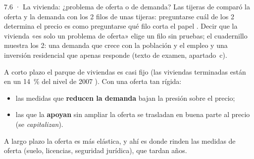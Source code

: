 \begin{complemento}{7.6 · La vivienda: ¿problema de oferta o de demanda? Las tijeras de }
  comparó la oferta y la demanda con los 2 filos de unas tijeras: preguntarse cuál de los 2 determina el precio es como preguntarse qué filo corta el papel \parencite[libro~V, cap.~III]{Marshall1890}. Decir que la vivienda «es solo un problema de oferta» elige un filo sin pruebas; el cuadernillo muestra los 2: una demanda que crece con la población y el empleo y una inversión residencial que apenas responde (texto de examen, apartado~c).

 A corto plazo el parque de viviendas es casi fijo (las viviendas terminadas están en un 14~\% del nivel de 2007 ). Con una oferta tan rígida:
\begin{itemize}
\item las medidas que \textbf{reducen la demanda} bajan la presión sobre el precio;
\item las que la \textbf{apoyan} sin ampliar la oferta se trasladan en buena parte al precio (se \emph{capitalizan}).
\end{itemize}
A largo plazo la oferta es más elástica, y ahí es donde rinden las medidas de oferta (suelo, licencias, seguridad jurídica), que tardan años.


\end{complemento}
